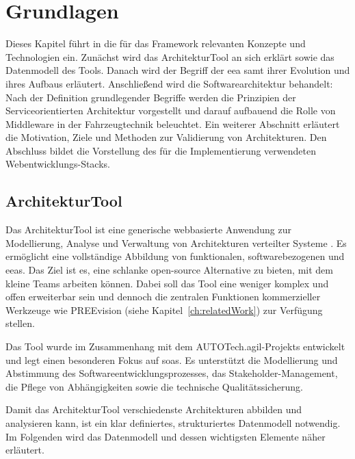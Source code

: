 \chapter{Grundlagen}
\label{ch:basics}

Dieses Kapitel führt in die für das Framework relevanten Konzepte und Technologien ein. Zunächst wird das ArchitekturTool an sich erklärt sowie das Datenmodell des Tools. Danach wird der Begriff der \gls{eea} samt ihrer Evolution und ihres Aufbaus erläutert. Anschließend wird die Softwarearchitektur behandelt: Nach der Definition grundlegender Begriffe werden die Prinzipien der Serviceorientierten Architektur vorgestellt und darauf aufbauend die Rolle von Middleware in der Fahrzeugtechnik beleuchtet. Ein weiterer Abschnitt erläutert die Motivation, Ziele und Methoden zur Validierung von Architekturen. Den Abschluss bildet die Vorstellung des für die Implementierung verwendeten Webentwicklungs-Stacks.


\section{ArchitekturTool}
\label{sec:tool}

Das ArchitekturTool ist eine generische webbasierte Anwendung zur Modellierung, Analyse und Verwaltung von Architekturen verteilter Systeme \cite{architekturtooldocu2024}. Es ermöglicht eine vollständige Abbildung von funktionalen, softwarebezogenen und \glspl{eea}. Das Ziel ist es, eine schlanke open-source Alternative zu bieten, mit dem kleine Teams arbeiten können. Dabei soll das Tool eine weniger komplex und offen erweiterbar sein und dennoch die zentralen Funktionen kommerzieller Werkzeuge wie PREEvision (siehe Kapitel~\ref{ch:relatedWork}) zur Verfügung stellen.

Das Tool wurde im Zusammenhang mit dem AUTOTech.agil-Projekts entwickelt und legt einen besonderen Fokus auf \glspl{soa}. Es unterstützt die Modellierung und Abstimmung des Softwareentwicklungsprozesses, das Stakeholder-Management, die Pflege von Abhängigkeiten sowie die technische Qualitätssicherung.

Damit das ArchitekturTool verschiedenste Architekturen abbilden und analysieren kann, ist ein klar definiertes, strukturiertes Datenmodell notwendig. Im Folgenden wird das Datenmodell und dessen wichtigsten Elemente näher erläutert.


